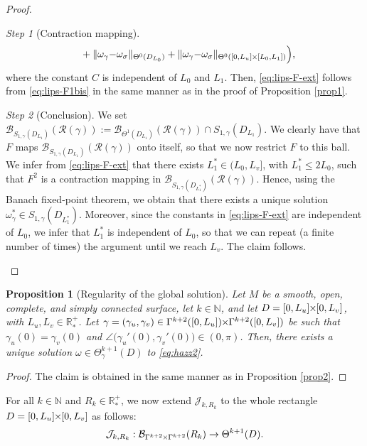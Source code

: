 \documentclass{article}
\newcommand{\RR}{\mathcal{R}}
\newcommand{\PLH}{{\mkern-1mu\times\mkern-1mu}}
\newcommand{\Times}{\PLH}
\newcommand{\R}{\mathbb{R}}
\newcommand{\surf}{M}
\newcommand{\EN}{\mathbb{N}}
\newcommand{\J}{\mathcal{J}}
\newtheorem{proposition}[theorem]{Proposition}
\theoremstyle{remark}
\theoremstyle{prpart}
\newtheorem{proofpart}{Step}
\newcommand{\B}{\mathcal{B}}
\begin{document}
\begin{proof}
\begin{proofpart}[Contraction mapping]
\begin{subequations}
\begin{align}
\begin{split}
          &~~\quad+ \|\omega_\gamma{-}\omega_\sigma\|_{\Theta^{0}(D_{L_0})} + \|\omega_\gamma{-}\omega_\sigma\|_{\Theta^{0}([0,L_u]\Times[L_0,L_1])}\Big),
        \end{split}\label{eq:lips-F1bis2}
      \end{align}
    \end{subequations}
    where the constant $C$ is independent of $L_0$ and $L_1$. Then, \eqref{eq:lips-F-ext} follows from \eqref{eq:lips-F1bis} in the same manner as in the proof of Proposition \ref{prop1}.
  \end{proofpart}
  \begin{proofpart}[Conclusion]
    We set $\B_{S_{1,\gamma}(D_{L_1})}(\RR(\gamma)):=\B_{\Theta^{1}(D_{L_1})}(\RR(\gamma))\cap S_{1,\gamma}(D_{L_1})$. We clearly have that $F$ maps $\B_{S_{1,\gamma}(D_{L_1})}(\RR(\gamma))$ onto itself, so that we now restrict $F$ to this ball. We infer from \eqref{eq:lips-F-ext} that there exists $L_1^\ast\in(L_0,L_v]$, with $L^\ast_1\leq 2L_0$, such that $F^2$ is a contraction mapping in $\B_{S_{1,\gamma}(D_{L_1^\ast})}(\RR(\gamma))$. Hence, using the Banach fixed-point theorem, we obtain that there exists a unique solution $\omega_\gamma^\ast\in S_{1,\gamma}(D_{L^\ast_1})$. Moreover, since the constants in  \eqref{eq:lips-F-ext} are independent of $L_0$, we infer that $L_1^\ast$ is independent of $L_0$, so that we can repeat (a finite number of times) the argument until we reach $L_v$. The claim follows.
  \end{proofpart}
\end{proof}
\begin{proposition}[Regularity of the global solution] \label{prop3-reg}
  Let $\surf$ be a smooth, open, complete, and simply connected surface, let $k\in\EN$, and let $D=[0,L_u]\Times[0,L_v]$, with $L_u,L_v\in\R^+_\ast$. Let $\gamma=(\gamma_u,\gamma_v) \in \Gamma^{k+2}([0,L_u])\Times\Gamma^{k+2}([0,L_v])$ be such that $\gamma_u(0)=\gamma_v(0)$ and $\angle\big(\gamma_u'(0),\gamma_v'(0)\big)\in(0,\pi)$. Then, there exists a unique solution $\omega\in\Theta^{k+1}_{\gamma}(D)$ to \eqref{eq:hazz2}.
\end{proposition}
\begin{proof}
  The claim is obtained in the same manner as in Proposition \ref{prop2}.
\end{proof}
For all $k\in\EN$ and $R_k\in\R^+_\ast$, we now extend $\J_{k,R_k}$ to the whole rectangle $D=[0,L_u]\Times[0,L_v]$ as follows:
\begin{equation*}%
 \J_{k,R_k} : \B_{\Gamma^{k+2}\Times \Gamma^{k+2}}(R_k) \to \Theta^{k+1}(D).
\end{equation*} 
\end{document}
